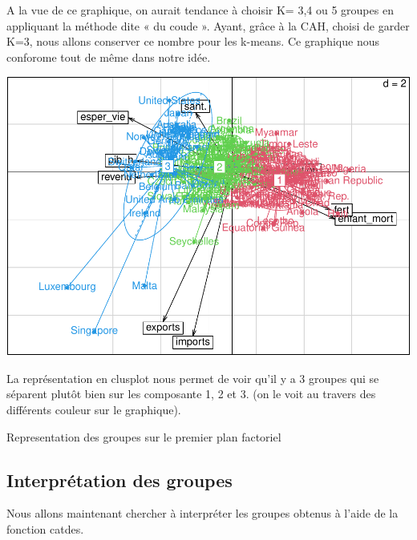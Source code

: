 \documentclass[
]{article}
\newenvironment{Shaded}{}{}
\newcommand{\AttributeTok}[1]{#1}
\newcommand{\DecValTok}[1]{#1}
\newcommand{\FunctionTok}[1]{#1}
\newcommand{\NormalTok}[1]{#1}
\newcommand{\OtherTok}[1]{\textcolor[rgb]{1.00,0.25,0.00}{#1}}
\newcommand{\SpecialCharTok}[1]{\textcolor[rgb]{0.00,0.50,0.50}{#1}}
\begin{document}
A la vue de ce graphique, on aurait tendance à choisir K= 3,4 ou 5
groupes en appliquant la méthode dite « du coude ». Ayant, grâce à la
CAH, choisi de garder K=3, nous allons conserver ce nombre pour les
k-means. Ce graphique nous conforome tout de même dans notre idée.

\begin{Shaded}
\end{Shaded}

\includegraphics{Projet_files/figure-latex/unnamed-chunk-25-1.pdf}

La représentation en clusplot nous permet de voir qu'il y a 3 groupes
qui se séparent plutôt bien sur les composante 1, 2 et 3. (on le voit au
travers des différents couleur sur le graphique).

Representation des groupes sur le premier plan factoriel

\hypertarget{interpruxe9tation-des-groupes}{%
\subsection{Interprétation des
groupes}\label{interpruxe9tation-des-groupes}}

Nous allons maintenant chercher à interpréter les groupes obtenus à
l'aide de la fonction catdes.
\end{document}

